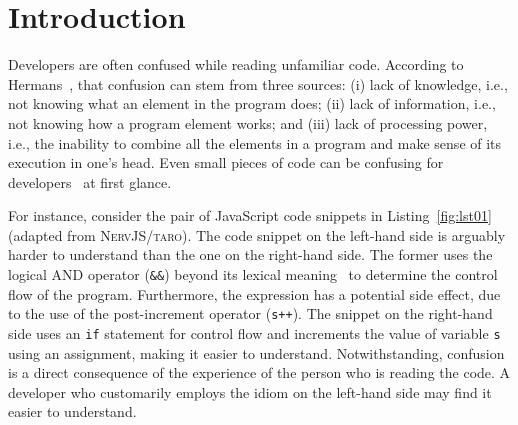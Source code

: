 \section{Introduction}
\label{intro}





Developers are often confused while reading unfamiliar code. According to Hermans~\cite{ProgrammersBrain}, that confusion can stem from three sources: (i) lack of knowledge, i.e., not knowing what an element in the program does; (ii) lack of information, i.e., not knowing how a program element works; and (iii) lack of processing power, i.e., the inability to combine all the elements in a program and make sense of its execution in one's head. Even small pieces of code can be confusing for developers~\cite{Ajami:2017:SPI,DBLP:conf/sigsoft/GopsteinIYDZYC17} at first glance.

For instance, consider the pair of JavaScript code snippets in Listing~\ref{fig:lst01} (adapted from \textsc{NervJS/taro}). The code snippet on the left-hand side is arguably harder to understand than the one on the right-hand side. The former uses the logical AND operator (\texttt{\&\&}) beyond its lexical meaning~\cite{castor2018} to determine the control flow of the program. Furthermore, the expression has a potential side effect, due to the use of the post-increment operator (\texttt{s++}). The snippet on the right-hand side uses an \texttt{if} statement for control flow and increments the value of variable \texttt{s} using an assignment, making it easier to understand. Notwithstanding, confusion is a direct consequence of the experience of the person who is reading the code. A developer who customarily employs the idiom on the left-hand side may find it easier to understand. 

